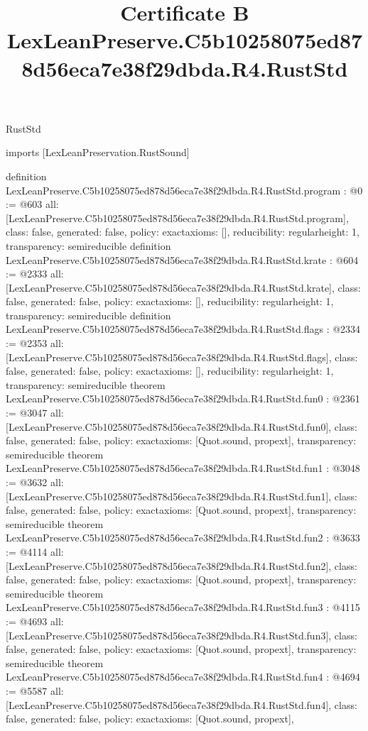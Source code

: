 \begin{lexlean}{RustStd}
\title{Certificate B LexLeanPreserve.C5b10258075ed878d56eca7e38f29dbda.R4.RustStd}
\begin{coremodule}
imports [LexLeanPreservation.RustSound]

definition LexLeanPreserve.C5b10258075ed878d56eca7e38f29dbda.R4.RustStd.program : @0 := @603 {
  all: [LexLeanPreserve.C5b10258075ed878d56eca7e38f29dbda.R4.RustStd.program],
  class: false,
  generated: false,
  policy: exact{axioms: []},
  reducibility: regular{height: 1},
  transparency: semireducible
}
definition LexLeanPreserve.C5b10258075ed878d56eca7e38f29dbda.R4.RustStd.krate : @604 := @2333 {
  all: [LexLeanPreserve.C5b10258075ed878d56eca7e38f29dbda.R4.RustStd.krate],
  class: false,
  generated: false,
  policy: exact{axioms: []},
  reducibility: regular{height: 1},
  transparency: semireducible
}
definition LexLeanPreserve.C5b10258075ed878d56eca7e38f29dbda.R4.RustStd.flags : @2334 := @2353 {
  all: [LexLeanPreserve.C5b10258075ed878d56eca7e38f29dbda.R4.RustStd.flags],
  class: false,
  generated: false,
  policy: exact{axioms: []},
  reducibility: regular{height: 1},
  transparency: semireducible
}
theorem LexLeanPreserve.C5b10258075ed878d56eca7e38f29dbda.R4.RustStd.fun0 : @2361 := @3047 {
  all: [LexLeanPreserve.C5b10258075ed878d56eca7e38f29dbda.R4.RustStd.fun0],
  class: false,
  generated: false,
  policy: exact{axioms: [Quot.sound, propext]},
  transparency: semireducible
}
theorem LexLeanPreserve.C5b10258075ed878d56eca7e38f29dbda.R4.RustStd.fun1 : @3048 := @3632 {
  all: [LexLeanPreserve.C5b10258075ed878d56eca7e38f29dbda.R4.RustStd.fun1],
  class: false,
  generated: false,
  policy: exact{axioms: [Quot.sound, propext]},
  transparency: semireducible
}
theorem LexLeanPreserve.C5b10258075ed878d56eca7e38f29dbda.R4.RustStd.fun2 : @3633 := @4114 {
  all: [LexLeanPreserve.C5b10258075ed878d56eca7e38f29dbda.R4.RustStd.fun2],
  class: false,
  generated: false,
  policy: exact{axioms: [Quot.sound, propext]},
  transparency: semireducible
}
theorem LexLeanPreserve.C5b10258075ed878d56eca7e38f29dbda.R4.RustStd.fun3 : @4115 := @4693 {
  all: [LexLeanPreserve.C5b10258075ed878d56eca7e38f29dbda.R4.RustStd.fun3],
  class: false,
  generated: false,
  policy: exact{axioms: [Quot.sound, propext]},
  transparency: semireducible
}
theorem LexLeanPreserve.C5b10258075ed878d56eca7e38f29dbda.R4.RustStd.fun4 : @4694 := @5587 {
  all: [LexLeanPreserve.C5b10258075ed878d56eca7e38f29dbda.R4.RustStd.fun4],
  class: false,
  generated: false,
  policy: exact{axioms: [Quot.sound, propext]},
}
\end{coremodule}
\end{lexlean}
